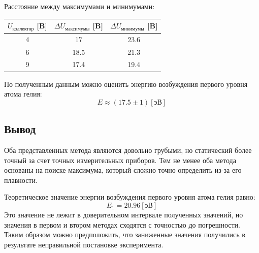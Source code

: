 \documentclass[a4paper,12pt]{article} %
\begin{document}
	\newpage
			Расстояние между максимумами и минимумами:
			\begin{table}[h!]
				\centering
				\begin{tabular}{|c|c|c|}
				\hline
				$U_\text{коллектор}$ [B] & $\Delta U_\text{максимумы}$ [B]  & $\Delta U_\text{минимумы}$ [B]\\ \hline
				4                        & 17                           	& 23.6                      	\\ \hline
				6                        & 18.5                         	& 21.3                      	\\ \hline
				9                        & 17.4                         	& 19.4                      	\\ \hline
				\end{tabular}
			\end{table}\par
			По полученным данным можно оценить энергию возбуждения первого уровня атома гелия:
			\begin{equation}
				E \approx (17.5 \pm 1) [\text{эВ}] 
			\end{equation}
		
		\subsection{Вывод}
			Оба представленных метода являются довольно грубыми, но статический более точный за счет точных измерительных приборов.
			Тем не менее оба метода основаны на поиске максимума, который сложно точно определить из-за его плавности.\par
			Теоретическое значение энергии возбуждения первого уровня атома гелия равно:
			\begin{equation}
				E_1 = 20.96 [\text{эВ}]
			\end{equation}
			Это значение не лежит в доверительном интервале полученных значений, но значения в первом и втором методах сходятся с точностью до погрешности.
			Таким образом можно предположить, что заниженные значения получились в результате неправильной постановке эксперимента.
			
\end{document}
